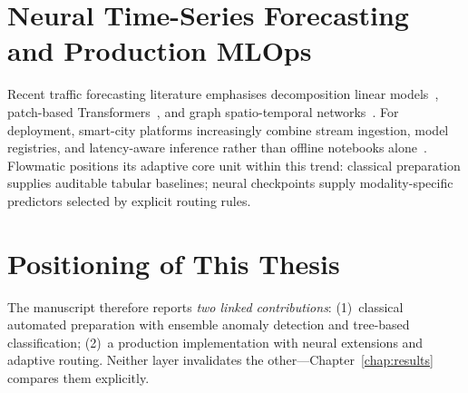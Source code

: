 %
%

\section{Neural Time-Series Forecasting and Production MLOps}

Recent traffic forecasting literature emphasises decomposition linear models~\cite{zeng2023transformers}, patch-based Transformers~\cite{nie2023patchtst}, and graph spatio-temporal networks~\cite{yu2018stgcn}. For deployment, smart-city platforms increasingly combine stream ingestion, model registries, and latency-aware inference rather than offline notebooks alone~\cite{its_bigdata2018,event_driven2025}. Flowmatic positions its adaptive core unit within this trend: classical preparation supplies auditable tabular baselines; neural checkpoints supply modality-specific predictors selected by explicit routing rules.

\section{Positioning of This Thesis}

The manuscript therefore reports \emph{two linked contributions}: (1)~classical automated preparation with ensemble anomaly detection and tree-based classification; (2)~a production implementation with neural extensions and adaptive routing. Neither layer invalidates the other---Chapter~\ref{chap:results} compares them explicitly.
